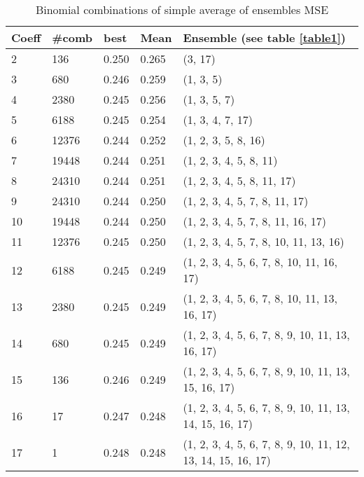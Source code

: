 \documentclass[10pt,letterpaper]{article}
\begin{document}
\begin{center}
\begin{table}[hbt!]
\caption{Binomial combinations of simple average of ensembles MSE}
\begin{tabular}{ |l|l|l|l|l| }
\hline
Coeff & \#comb & best & Mean & Ensemble  (see table \ref{table1}) \\ \hline
2 & 136 &    0.250 & 0.265 & (3, 17) \\ \hline
3 & 680 &    0.246 & 0.259 & (1, 3, 5) \\ \hline
4 & 2380 &   0.245 & 0.256 & (1, 3, 5, 7) \\ \hline
5 & 6188 &   0.245 & 0.254 & (1, 3, 4, 7, 17) \\ \hline
6 & 12376 &  0.244 & 0.252 & (1, 2, 3, 5, 8, 16) \\ \hline
7 & 19448 &  0.244 & 0.251 & (1, 2, 3, 4, 5, 8, 11) \\ \hline
8 & 24310 &  0.244 & 0.251 & (1, 2, 3, 4, 5, 8, 11, 17) \\ \hline
9 & 24310 &  0.244 & 0.250 & (1, 2, 3, 4, 5, 7, 8, 11, 17) \\ \hline
10 & 19448 & 0.244 & 0.250 & (1, 2, 3, 4, 5, 7, 8, 11, 16, 17) \\ \hline
11 & 12376 & 0.245 & 0.250 & (1, 2, 3, 4, 5, 7, 8, 10, 11, 13, 16) \\ \hline
12 & 6188 &  0.245 & 0.249 & (1, 2, 3, 4, 5, 6, 7, 8, 10, 11, 16, 17) \\ \hline
13 & 2380 &  0.245 & 0.249 & (1, 2, 3, 4, 5, 6, 7, 8, 10, 11, 13, 16, 17) \\ \hline
14 & 680 &   0.245 & 0.249 & (1, 2, 3, 4, 5, 6, 7, 8, 9, 10, 11, 13, 16, 17) \\ \hline
15 & 136 &   0.246 & 0.249 & (1, 2, 3, 4, 5, 6, 7, 8, 9, 10, 11, 13, 15, 16, 17) \\ \hline
16 & 17 &    0.247 & 0.248 & (1, 2, 3, 4, 5, 6, 7, 8, 9, 10, 11, 13, 14, 15, 16, 17) \\ \hline
17 & 1 &     0.248 & 0.248 & (1, 2, 3, 4, 5, 6, 7, 8, 9, 10, 11, 12, 13, 14, 15, 16, 17) \\ \hline
\end{tabular}
\label{table7}
\end{table}
\end{center}
\end{document}
